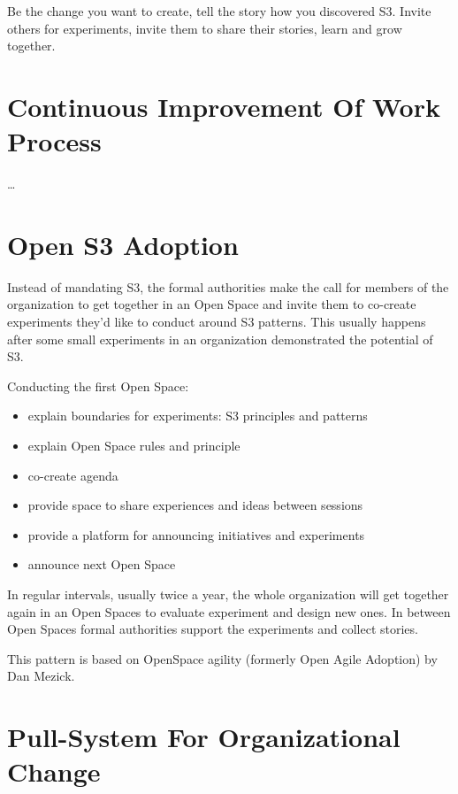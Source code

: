 Be the change you want to create, tell the story how you discovered S3. Invite others for experiments, invite them to share their stories, learn and grow together.

\section{Continuous Improvement Of Work Process}
\label{continuousimprovementofworkprocess}

{\ldots}

\section{Open S3 Adoption}
\label{opens3adoption}

Instead of mandating S3, the formal authorities make the call for members of the organization to get together in an Open Space and invite them to co-create experiments they'd like to conduct around S3 patterns. This usually happens after some small experiments in an organization demonstrated the potential of S3.

Conducting the first Open Space:

\begin{itemize}
\item explain boundaries for experiments: S3 principles and patterns

\item explain Open Space rules and principle

\item co-create agenda

\item provide space to share experiences and ideas between sessions

\item provide a platform for announcing initiatives and experiments

\item announce next Open Space

\end{itemize}

In regular intervals, usually twice a year, the whole organization will get together again in an Open Spaces to evaluate experiment and design new ones. In between Open Spaces formal authorities support the experiments and collect stories.

This pattern is based on OpenSpace agility (formerly Open Agile Adoption) by Dan Mezick.

\section{Pull-System For Organizational Change}
\label{pull-systemfororganizationalchange}

